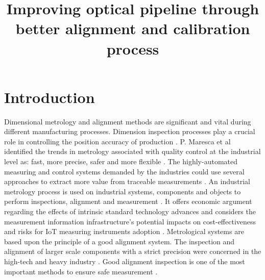 \documentclass[10pt,a4paper,onecolumn]{article}
\begin{document}
	
	\title{\textbf{Improving optical pipeline through better alignment and calibration process 
	}}

\maketitle

	\section{Introduction}
	\label{intro}
	Dimensional metrology and alignment methods are significant and vital during different manufacturing processes. Dimension inspection processes play a crucial role in controlling the position accuracy of production \cite{gu2020study}. P. Maresca et al identified the trends in metrology associated with quality control at the industrial level as: fast, more precise, safer and more flexible \cite{maresca2019evaluation}. The highly-automated measuring and control systems demanded by the industries could use several approaches to extract more value from traceable measurements \cite{hall2019opportunity}. An industrial metrology process is used on industrial systems, components and objects to perform inspections, alignment and measurement \cite{oyin2020machine}. It offers economic argument regarding the effects of intrinsic standard technology advances and considers the measurement information infrastructure's potential impacts on cost-effectiveness and risks for IoT measuring instruments adoption \cite{kuster2020measurement}. Metrological systems are based upon the principle of a good alignment system. The inspection and alignment of larger scale components with a strict precision were concerned in the high-tech and heavy industry \cite{gu2020study}. Good alignment inspection is one of the most important methods to ensure safe measurement \cite{peng2020inertial}.
	
	\newpage
	
	
	
	
\end{document}
